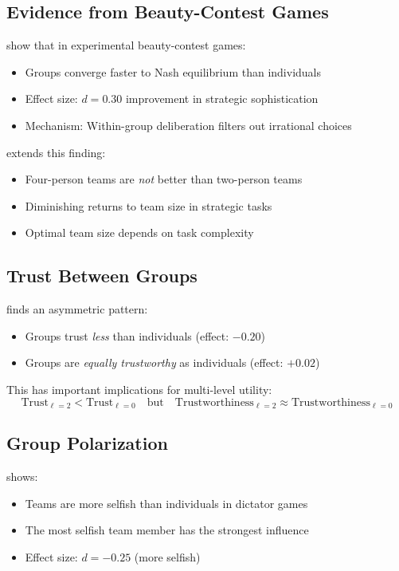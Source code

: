 \subsection{Evidence from Beauty-Contest Games}

\citet{kocher2005decision} show that in experimental beauty-contest games:
\begin{itemize}
\item Groups converge faster to Nash equilibrium than individuals
\item Effect size: $d = 0.30$ improvement in strategic sophistication
\item Mechanism: Within-group deliberation filters out irrational choices
\end{itemize}

\citet{sutter2005four} extends this finding:
\begin{itemize}
\item Four-person teams are \textit{not} better than two-person teams
\item Diminishing returns to team size in strategic tasks
\item Optimal team size depends on task complexity
\end{itemize}

\subsection{Trust Between Groups}

\citet{kugler2007trust} finds an asymmetric pattern:
\begin{itemize}
\item Groups trust \textit{less} than individuals (effect: $-0.20$)
\item Groups are \textit{equally trustworthy} as individuals (effect: $+0.02$)
\end{itemize}

This has important implications for multi-level utility:
\begin{equation}
\text{Trust}_{\ell=2} < \text{Trust}_{\ell=0} \quad \text{but} \quad \text{Trustworthiness}_{\ell=2} \approx \text{Trustworthiness}_{\ell=0}
\end{equation}

\subsection{Group Polarization}

\citet{luhan2009polarization} shows:
\begin{itemize}
\item Teams are more selfish than individuals in dictator games
\item The most selfish team member has the strongest influence
\item Effect size: $d = -0.25$ (more selfish)
\end{itemize}


